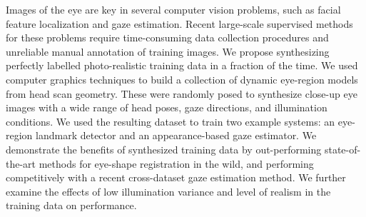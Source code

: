 Images of the eye are key in several computer vision problems, such as facial feature localization and gaze estimation.
Recent large-scale supervised methods for these problems require time-consuming data collection procedures and unreliable manual annotation of training images.
We propose synthesizing perfectly labelled photo-realistic training data in a fraction of the time.
We used computer graphics techniques to build a collection of dynamic eye-region models from head scan geometry.
%
These were randomly posed to synthesize close-up eye images with a wide range of head poses, gaze directions, and illumination conditions.
%
We used the resulting dataset to train two example systems: an eye-region landmark detector and an appearance-based gaze estimator.
We demonstrate the benefits of synthesized training data by out-performing state-of-the-art methods for eye-shape registration in the wild, and performing competitively with a recent cross-dataset gaze estimation method.
We further examine the effects of low illumination variance and level of realism in the training data on performance.
%